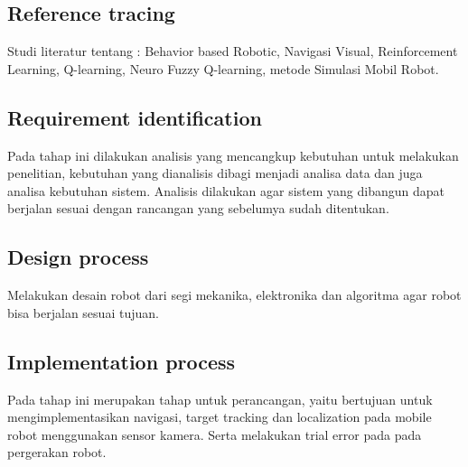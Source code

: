 
\subsection{Reference tracing}
Studi literatur tentang :
Behavior based Robotic, Navigasi Visual, Reinforcement Learning, Q-learning, Neuro Fuzzy Q-learning, metode Simulasi Mobil Robot.

\subsection{Requirement identification}

Pada tahap ini dilakukan analisis yang mencangkup kebutuhan untuk melakukan penelitian, kebutuhan yang dianalisis dibagi menjadi analisa data dan juga analisa kebutuhan sistem. Analisis dilakukan agar sistem yang dibangun dapat berjalan sesuai dengan rancangan yang sebelumya sudah ditentukan.

\subsection{Design process}
Melakukan desain robot dari segi mekanika, elektronika dan algoritma agar robot bisa berjalan sesuai tujuan.

\subsection{Implementation process }
Pada tahap ini merupakan tahap untuk perancangan, yaitu bertujuan untuk mengimplementasikan navigasi, target tracking dan localization pada mobile robot menggunakan sensor kamera. Serta melakukan trial error pada pada pergerakan robot.

